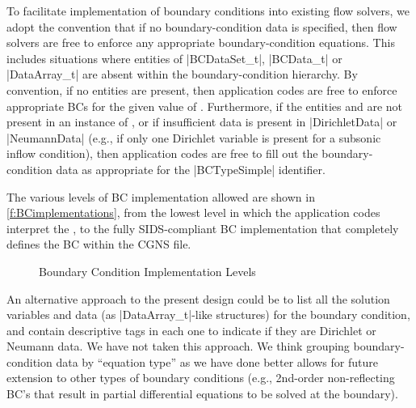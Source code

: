 To facilitate implementation of boundary conditions into existing flow
solvers, we adopt the convention that if no boundary-condition data is
specified, then flow solvers are free to enforce any appropriate
boundary-condition equations.
This includes situations where entities of |BCDataSet_t|, |BCData_t|
or |DataArray_t| are absent within the boundary-condition hierarchy.
By convention, if no  entities are present, then
application codes are free to enforce appropriate BCs for the given
value of .
Furthermore, if the entities  and 
are not present in an instance of , or if
insufficient data is present in |DirichletData| or |NeumannData|
(e.g., if only one Dirichlet variable is present for a subsonic
inflow condition), then application codes are free to fill out
the boundary-condition data as appropriate for the |BCTypeSimple|
identifier.

The various levels of BC implementation allowed are shown in
\autoref{f:BCimplementations}, from the lowest level in which
the application codes interpret the , to the fully
SIDS-compliant BC implementation that completely defines the BC within
the CGNS file.

\setlength{\tmplength}{\unitlength}	%
\setlength{\unitlength}{\baselineskip}	%
\begin{figure}[!htb]
   \centering
   \begin{minipage}[b]{0.295\linewidth}
   \end{minipage}%
   \hfill%
   \begin{minipage}[b]{0.614\linewidth}
   \end{minipage}
   \caption{Boundary Condition Implementation Levels}
   \label{f:BCimplementations}
\end{figure}
\setlength{\unitlength}{\tmplength}	%

An alternative approach to the present design could be to list all the
solution variables and data (as |DataArray_t|-like structures) for the
boundary condition, and contain descriptive tags in each one to indicate
if they are Dirichlet or Neumann data.  We have not taken this approach.
We think grouping boundary-condition data by ``equation type'' as we have
done better allows for future extension to other types of boundary
conditions (e.g., 2nd-order non-reflecting BC's that result in
partial differential equations
to be solved at the boundary).


